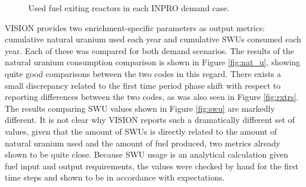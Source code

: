 \begin{figure}[ht]
  \centering
  \quad
\caption{Used fuel exiting reactors in each INPRO demand case.}
\label{fig:used_fuel}
\end{figure}

VISION provides two enrichment-specific parameters as output metrics: cumulative
natural uranium used each year and cumulative SWUs consumed each year. Each of
these was compared for both demand scenarios. The results of the natural uranium
consumption comparison is shown in Figure \ref{fig:nat_u}, showing quite good
comparisons between the two codes in this regard. There exists a small
discrepancy related to the first time period phase shift with respect to
reporting differences between the two codes, as was also seen in Figure
\ref{fig:rxtrs}. The results comparing SWU values shown in Figure \ref{fig:swu}
are markedly different. It is not clear why VISION reports such a dramatically
different set of values, given that the amount of SWUs is directly related to
the amount of natural uranium used and the amount of fuel produced, two metrics
already shown to be quite close. Because SWU usage is an analytical calculation
given fuel input and output requirements, the \Cyclus values were checked by
hand for the first time steps and shown to be in accordance with expectations.

